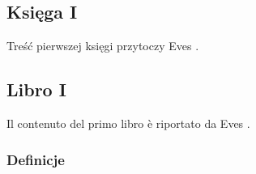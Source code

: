 
%

\subsection{Księga I} %
Treść pierwszej księgi przytoczy Eves \cite[s. 375-379]{eves1_1972}. %
\subsection{Libro I} %
Il contenuto del primo libro è riportato da Eves \cite[p. 375-379]{eves1_1972}. %

\subsubsection{Definicje} %
